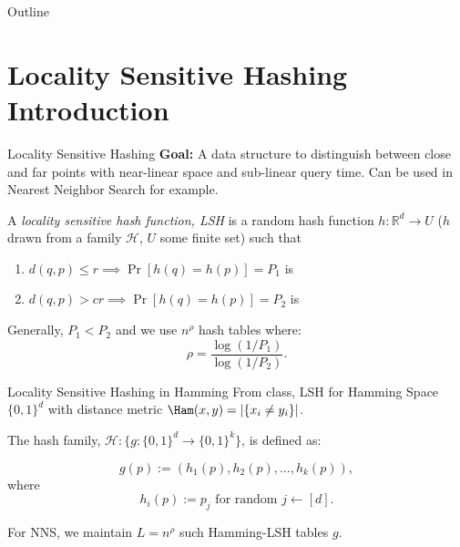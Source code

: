 \documentclass[xcolor=svgnames]{beamer}
\title[\shorttitle]{\maintitle}
\subtitle{\sbtitle}
\author[\sauthors]{\lauthors\\ \scriptsize{\em \home}}
\institute{\venue\\ \tiny{\location}}
\date[\sdate]{\scriptsize{\ldate}}
\begin{document}
\begin{frame}[plain]
	\titlepage
\end{frame}

\begin{frame}[plain]{Outline}
	\tableofcontents
\end{frame}

\section{Locality Sensitive Hashing Introduction}

\begin{frame}{Locality Sensitive Hashing}
\textbf{Goal:} A data structure to distinguish between close and far points with near-linear space and sub-linear query time. Can be used in Nearest Neighbor Search for example.

\begin{definition}[informal]
  A \emph{locality sensitive hash function, LSH} is a random hash function
  $h:\mathbb{R}^d \to U$
  ($h$ drawn from a family $\mathcal{H}$, $U$ some finite set) such that
  \begin{enumerate}
    \item $d(q,p) \leq r \implies \Pr[h(q)=h(p)] = P_1$ is 
    \item $d(q,p) > cr \implies \Pr[h(q)=h(p)] = P_2$ is 
  \end{enumerate}
  Generally, $P_1<P_2$ and we use $n^\rho$ hash tables where:
  \[ \rho = \frac{\log(1/P_1)}{\log(1/P_2)}.\]
\end{definition}
\end{frame}

\begin{frame}{Locality Sensitive Hashing in Hamming}
From class, LSH for Hamming Space $\{0,1\}^d$ with distance metric $\Ham(x,y)=|\{x_i\neq y_i\}|$.

The hash family, $\mathcal{H} : \{g:\{0,1\}^d \to \{0,1\}^k\}$, is defined as:

\[ g(p) := (h_1(p), h_2(p), \ldots, h_k(p)),\]
where
\[ h_i(p):= p_j \mbox{ for random } j \leftarrow [d].\]

For NNS, we maintain $L = n^\rho$ such Hamming-LSH tables $g$.

\end{frame}
\end{document}
